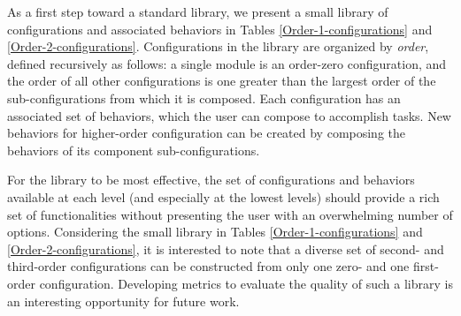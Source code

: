 \documentclass[graybox]{svmult}
\begin{document}
As a first step toward a standard library, we present a small library of configurations
and associated behaviors in Tables \ref{Order-1-configurations} and \ref{Order-2-configurations}.
Configurations in the library are organized by \textit{order}, defined recursively
as follows: a single module is an order-zero configuration, and the order of all
other configurations is one greater than the largest order of the sub-configurations
from which it is composed. Each configuration has an associated set of behaviors,
which the user can compose to accomplish tasks.  New behaviors for higher-order configuration can be created by composing the behaviors of its component sub-configurations.

For the library to be most effective, the set of configurations and behaviors available
 at each level (and especially at the lowest levels) should provide a rich set of
 functionalities without presenting the user with an overwhelming number of options. 
 Considering the small library in Tables \ref{Order-1-configurations} and \ref{Order-2-configurations},
 it is interested to note that a diverse set of second- and third-order configurations can
be constructed from only one zero- and one first-order configuration. Developing metrics to
evaluate the quality of such a library is an interesting opportunity for future work. 
\end{document}

